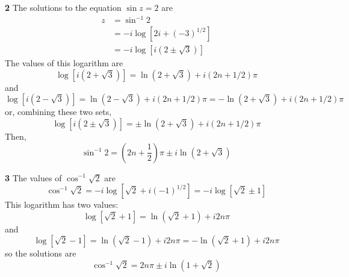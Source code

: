 \documentclass{article}
\begin{document}
\textbf{2}
The solutions to the equation $\sin z = 2$ are
\begin{align*}
	z &= \sin^{-1} 2 \\
	&= -i \log [2i + (-3)^{1/2}] \\
	&= -i \log [i (2 \pm \sqrt{3})]
\end{align*}
The values of this logarithm are
\[
	\log[i (2 + \sqrt{3})]
	= \ln(2 + \sqrt{3}) + i(2n + 1/2)\pi 
\]
and
\[
	\log[i (2 - \sqrt{3})]
	= \ln(2 - \sqrt{3}) + i(2n + 1/2)\pi
	= -\ln(2 + \sqrt{3}) + i(2n + 1/2)\pi
\]
or, combining these two sets,
\[
	\log[i (2 \pm \sqrt{3})]
	= \pm \ln(2 + \sqrt{3}) + i(2n + 1/2)\pi
\]
Then,
\[
	\sin^{-1} 2
	= \left(2n + \frac{1}{2} \right) \pi \pm i\ln(2 + \sqrt{3})
\]

\textbf{3}
The values of $\cos^{-1} \sqrt{2}$ are
\[
	\cos^{-1} \sqrt{2}
	= -i \log[\sqrt{2} + i(-1)^{1/2}]
	= -i \log[\sqrt{2} \pm 1]
\]
This logarithm has two values:
\[
	\log[\sqrt{2} + 1] 
	= \ln(\sqrt{2} + 1) + i2n\pi
\]
and
\[
	\log[\sqrt{2} - 1]
	= \ln(\sqrt{2} - 1) + i2n\pi
	= -\ln(\sqrt{2} + 1) + i2n\pi
\]
so the solutions are
\[
	\cos^{-1} \sqrt{2}
	= 2n\pi \pm i \ln(1 + \sqrt{2})
\]
\end{document}
